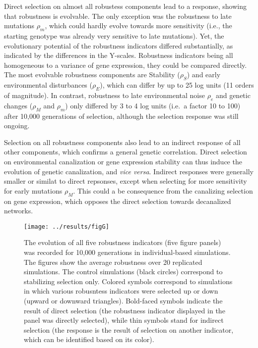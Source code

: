\documentclass[10pt,a4paper]{article}
\newcommand{\stability}{{\rho_S}}
\newcommand{\earlyenv}{{\rho_E}}
\newcommand{\lateenv}{{\rho_e}}
\newcommand{\earlymut}{{\rho_M}}
\newcommand{\latemut}{{\rho_m}}
\begin{document}
Direct selection on almost all robustess components lead to a response, showing that robustness is evolvable. The only exception was the robustness to late mutations $\latemut$, which could hardly evolve towards more sensitivity (i.e., the starting genotype was already very sensitive to late mutations). Yet, the evolutionary potential of the robustness indicators differed substantially, as indicated by the differences in the Y-scales. Robustness indicators being all homogeneous to a variance of gene expression, they could be compared directly. The most evolvable robustness components are Stability ($\stability$) and early environmental disturbances ($\earlyenv$), which can differ by up to 25 log units (11 orders of magnitude). In contrast, robustness to late environmental noise $\lateenv$ and genetic changes ($\earlymut$ and $\latemut$) only differed by 3 to 4 log units (i.e.\ a factor 10 to 100) after 10,000 generations of selection, although the selection response was still ongoing. 

Selection on all robustness components also lead to an indirect response of all other components, which confirms a general genetic correlation. Direct selection on environmental canalization or gene expression stability can thus induce the evolution of genetic canalization, and \emph{vice versa}. Indirect responses were generally smaller or similat to direct repsonses, except when selecting for more sensitivity for early mutations $\earlymut$. This could a be consequence from the canalizing selection on gene expression, which opposes the direct selection towards decanalized networks. 


\begin{figure}[t]
\begin{adjustwidth}{-1in}{0in}
\begin{flushright}
\texttt{[image: ../results/figG]}
\caption{\color{Gray} \label{fig:evol} The evolution of all five robustness indicators (five figure panels) was recorded for 10,000 generations in individual-based simulations. The figures show the average robustness over 20 replicated simulations. The control simulations (black circles) correspond to stabilizing selection only. Colored symbols correspond to simulations in which various robusntess indicators were selected up or down (upward or downward triangles). Bold-faced symbols indicate the result of direct selection (the robustness indicator displayed in the panel was directly selected), while thin symbols stand for indirect selection (the response is the result of selection on another indicator, which can be identified based on its color). }
\end{flushright}\end{adjustwidth}
\end{figure}
\end{document}
